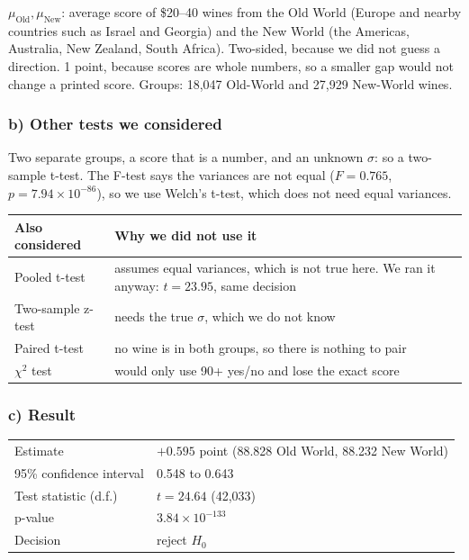\documentclass[10pt,a4paper,twocolumn]{article}
\newif\ifshowhints
\newcommand{\hint}[1]{\ifshowhints\par{\color{gray}\itshape\small #1\par}\fi}
\begin{document}
$\mu_{\text{Old}}, \mu_{\text{New}}$: average score of \$20--40 wines from the Old World (Europe and nearby countries
such as Israel and Georgia) and the New World (the Americas, Australia, New Zealand, South Africa). Two-sided, because
we did not guess a direction. 1 point, because scores are whole numbers, so a smaller gap would not change a printed
score. Groups: 18,047 Old-World and 27,929 New-World wines.

\subsubsection*{b) Other tests we considered}
\hint{Which other tests did you consider, and why did you not use them? Say first why your test fits your data.}
Two separate groups, a score that is a number, and an unknown $\sigma$: so a two-sample t-test. The F-test says the
variances are not equal ($F = 0.765$, $p = 7.94 \times 10^{-86}$), so we use Welch's t-test, which does not need equal
variances.

{\footnotesize
\begin{tabularx}{\columnwidth}{@{}P{23mm}L@{}}
\toprule
\textbf{Also considered} & \textbf{Why we did not use it}\\
\midrule
Pooled t-test & assumes equal variances, which is not true here. We ran it anyway: $t = 23.95$, same decision\\
Two-sample z-test & needs the true $\sigma$, which we do not know\\
Paired t-test & no wine is in both groups, so there is nothing to pair\\
$\chi^2$ test & would only use 90+ yes/no and lose the exact score\\
\bottomrule
\end{tabularx}\par}

\subsubsection*{c) Result}
\hint{Report the test statistic, degrees of freedom, p-value and decision, and the estimate with a 95\% confidence
interval. Is the difference large enough to matter?}
{\small
\begin{tabularx}{\columnwidth}{@{}HL@{}}
\toprule
Estimate & $+0.595$ point (88.828 Old World, 88.232 New World)\\
95\% confidence interval & 0.548 to 0.643\\
Test statistic (d.f.) & $t = 24.64$ (42,033)\\
p-value & $3.84 \times 10^{-133}$\\
Decision & reject $H_0$\\
\bottomrule
\end{tabularx}\par}
\end{document}
